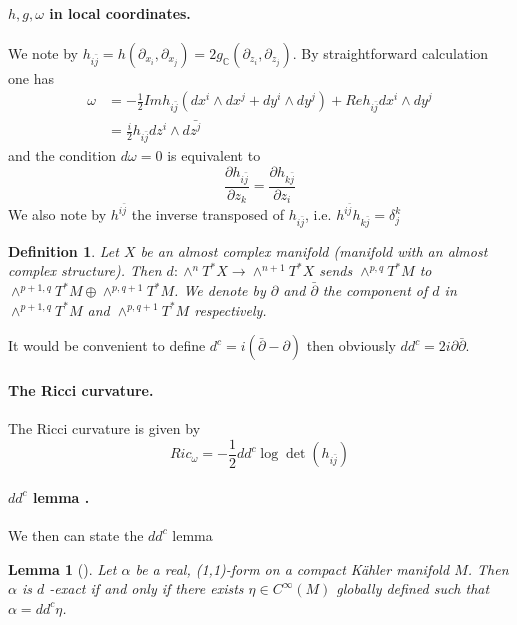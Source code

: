 \documentclass[11pt]{article}
\newtheorem{lemma}[theorem]{Lemma}
\newtheorem{definition}{Definition}
\begin{document}
\paragraph{\(h,g,\omega\) in local coordinates.}
\label{sec:org5d1413c}
We note by \(h_{i\bar j} = h(\partial_{x_i},\partial_{x_j}) =
2g_{\mathbb{C}}(\partial_{z_i},\partial_{z_j})\). By straightforward calculation one has
\begin{align*}
\omega & = -\frac{1}{2} Im h_{i\bar j} (dx^i\wedge dx^j + dy^i\wedge dy^j) + Re h_{i\bar j}dx^i\wedge dy^j\\
& = \frac{i}{2}h_{i\bar j}dz^i\wedge d\bar{z^j}
\end{align*}
and the condition \(d\omega = 0\) is equivalent to
\[
\frac{\partial h_{i\bar j}}{\partial z_k} = \frac{\partial h_{k\bar j}}{\partial z_i}
\]
We also note by \(h^{i\bar j}\) the inverse transposed of \(h_{i\bar j}\), i.e. \(h^{i\bar j}h_{k\bar j}
= \delta_j^k\)
\begin{definition}
Let \(X\) be an almost complex manifold (manifold with an almost complex structure). Then
\(d:\wedge^nT^*X\longrightarrow \wedge^{n+1}T^*X\) sends \(\wedge^{p,q}T^*M\) to
\(\wedge^{p+1,q}T^*M\oplus \wedge^{p,q+1}T^*M\). We denote by \(\partial\) and \(\bar\partial\) the
component of \(d\) in \(\wedge^{p+1,q}T^*M\) and \(\wedge^{p,q+1}T^*M\) respectively. 
\end{definition}
It would be convenient to define \(d^c =i(\bar\partial - \partial)\) then obviously \(dd^c =
2i\partial\bar\partial\). 


\paragraph{The Ricci curvature.}
\label{sec:org8f64d3a}
The Ricci curvature is given by
\[
Ric_{\omega} = -\frac{1}{2}dd^c\log\det(h_{i\bar j})
\]


\paragraph{\(dd^c\) lemma .}
\label{sec:orge83ab23}
We then can state the \(dd^c\) lemma
\begin{lemma}[]
Let \(\alpha\) be a real, (1,1)-form on a compact Kähler manifold \(M\). Then \(\alpha\) is \(d\) -exact if
and only if there exists \(\eta\in C^\infty(M)\) globally defined such that \(\alpha = dd^c\eta\).
\end{lemma}
\end{document}
